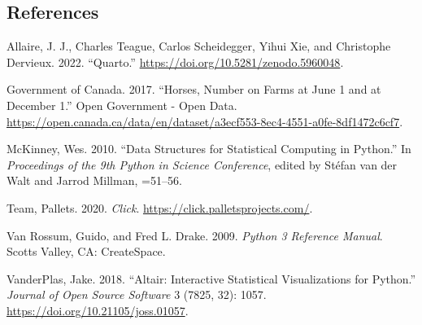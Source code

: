 \documentclass[
  letterpaper,
  DIV=11,
  numbers=noendperiod]{scrartcl}
\newlength{\cslhangindent}
\newenvironment{CSLReferences}[2] %
 {\begin{list}{}{%
  \setlength{\itemindent}{0pt}
  \setlength{\leftmargin}{0pt}
  \setlength{\parsep}{0pt}
  \ifodd #1
   \setlength{\leftmargin}{\cslhangindent}
   \setlength{\itemindent}{-1\cslhangindent}
  \fi
  \setlength{\itemsep}{#2\baselineskip}}}
 {\end{list}}
\begin{document}
\subsection*{References}\label{references}

\label{refs}
\begin{CSLReferences}{1}{0}
Allaire, J. J., Charles Teague, Carlos Scheidegger, Yihui Xie, and
Christophe Dervieux. 2022. {``{Quarto}.''}
\url{https://doi.org/10.5281/zenodo.5960048}.

Government of Canada. 2017. {``Horses, Number on Farms at June 1 and at
December 1.''} Open Government - Open Data.
\url{https://open.canada.ca/data/en/dataset/a3ecf553-8ec4-4551-a0fe-8df1472c6cf7}.

McKinney, Wes. 2010. {``Data Structures for Statistical Computing in
Python.''} In \emph{Proceedings of the 9th Python in Science
Conference}, edited by Stéfan van der Walt and Jarrod Millman, =51--56.

Team, Pallets. 2020. \emph{Click}.
\url{https://click.palletsprojects.com/}.

Van Rossum, Guido, and Fred L. Drake. 2009. \emph{Python 3 Reference
Manual}. Scotts Valley, CA: CreateSpace.

VanderPlas, Jake. 2018. {``Altair: Interactive Statistical
Visualizations for Python.''} \emph{Journal of Open Source Software} 3
(7825, 32): 1057. \url{https://doi.org/10.21105/joss.01057}.

\end{CSLReferences}
\end{document}
